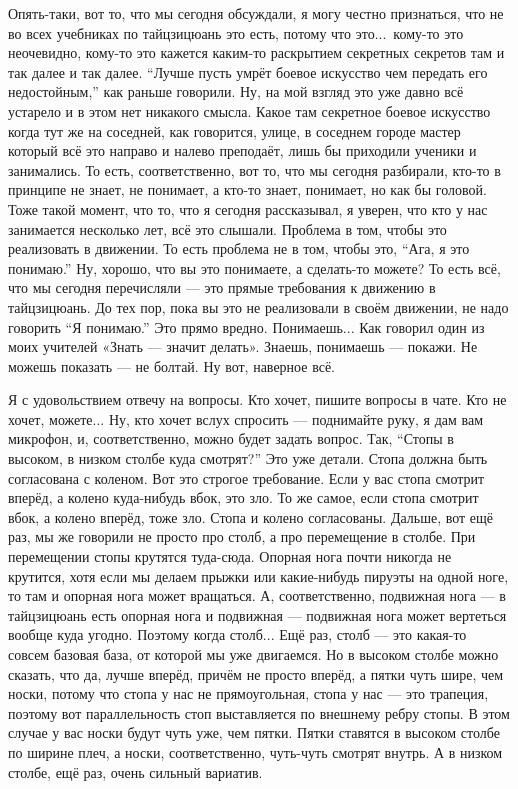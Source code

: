 Опять-таки, вот то, что мы сегодня обсуждали, я могу честно признаться, что не во всех
учебниках по тайцзицюань это есть, потому что это...\ кому-то это неочевидно, кому-то это кажется
каким-то раскрытием секретных секретов там и так далее и так далее. ``Лучше пусть умрёт боевое
искусство чем передать его недостойным,'' как раньше говорили. Ну, на мой взгляд это уже давно всё
устарело и в этом нет никакого смысла. Какое там секретное боевое искусство когда тут же на
соседней, как говорится, улице, в соседнем городе мастер который всё это направо и налево
преподаёт, лишь
бы приходили ученики и занимались. То есть, соответственно, вот то, что мы сегодня разбирали,
кто-то в принципе не знает, не понимает, а кто-то знает, понимает, но как бы головой. Тоже
такой момент, что то, что я сегодня рассказывал, я уверен, что кто у нас занимается несколько
лет, всё это слышали. Проблема в том, чтобы это реализовать в движении. То есть проблема не в
том, чтобы это, ``Ага, я это понимаю.'' Ну, хорошо, что вы это понимаете, а сделать-то можете? То
есть всё, что мы сегодня перечисляли --- это прямые требования к движению в тайцзицюань. До тех
пор, пока вы это
не реализовали в своём движении, не надо говорить ``Я понимаю.'' Это прямо вредно. Понимаешь...
Как говорил один из моих учителей «Знать --- значит делать». Знаешь, понимаешь --- покажи.
Не можешь показать --- не болтай. Ну вот, наверное всё.

Я с удовольствием отвечу на вопросы. Кто хочет,
пишите вопросы в чате. Кто не хочет, можете... Ну, кто хочет вслух спросить --- поднимайте руку, я
дам вам микрофон, и, соответственно, можно будет задать вопрос. Так, ``Стопы в высоком, в низком
столбе куда смотрят?'' Это уже детали. Стопа должна быть согласована с коленом. Вот это строгое
требование. Если у вас стопа смотрит вперёд, а колено куда-нибудь вбок, это зло. То же самое,
если стопа смотрит вбок, а колено вперёд, тоже зло. Стопа и колено согласованы. Дальше, вот
ещё раз, мы же говорили не просто про столб, а про перемещение в столбе. При перемещении стопы
крутятся туда-сюда. Опорная нога почти никогда не крутится, хотя если мы делаем прыжки или
какие-нибудь пируэты на одной ноге, то там и опорная нога может вращаться. А, соответственно,
подвижная нога --- в тайцзицюань есть опорная нога и подвижная --- подвижная нога может вертеться
вообще куда угодно. Поэтому когда столб... Ещё раз, столб --- это какая-то совсем базовая база, от
которой
мы уже двигаемся. Но в высоком столбе можно сказать, что да, лучше вперёд, причём не просто
вперёд, а пятки чуть шире, чем носки, потому что стопа у нас не прямоугольная, стопа у нас --- это
трапеция, поэтому вот параллельность стоп выставляется по внешнему ребру стопы. В этом случае
у вас носки будут чуть уже, чем пятки. Пятки ставятся в высоком столбе по ширине плеч, а
носки, соответственно, чуть-чуть смотрят внутрь. А в низком столбе, ещё раз, очень сильный
вариатив.

